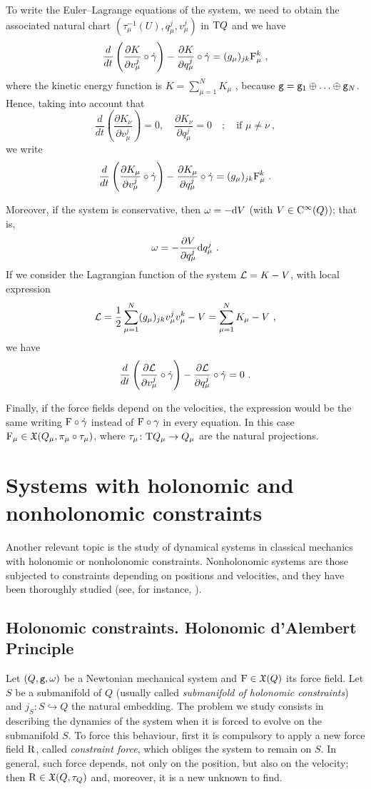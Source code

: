 \documentclass[12pt]{report}
\def\dst{\displaystyle}
\def\derpar#1#2{\frac{\partial{#1}}{\partial{#2}}}
\def\vf{\mathfrak X}
\def\Lag{{\cal L}}
\def\d{{\rm d}}
\def\Tan{{\rm T}}
\def\Cinfty{{\rm C}^\infty}
\begin{document}
To write the Euler--Lagrange equations of the system,
we need to obtain the associated natural chart $(\tau^{-1}_\mu (U),q_\mu^j,v_\mu^j)$
in $\Tan Q$ and we have
$$
\frac{d}{d t}\left(\derpar{K}{v^j_\mu}\circ\dot\gamma\right)-
\derpar{K}{q^j_\mu}\circ\dot\gamma=
( g_\mu)_{jk}{\rm F}_\mu^k \ ,
$$
where the kinetic energy function is \(\dst K=\sum_{\mu=1}^NK_\mu\) ,
because ${\tt g}={\tt g}_1\oplus\ldots\oplus {\tt g}_N$. Hence, taking into account that
$$
\frac{d}{d t}\left(\derpar{K_\nu}{v^j_\mu}\right)= 0 ,\quad
\derpar{K_\nu}{q^j_\mu}=0 \quad ;\quad \mbox{if $\mu\not=\nu$} \ ,
$$
we write
$$
\frac{d}{d t}\left(\derpar{K_\mu}{v^j_\mu}\circ\dot\gamma\right)-
\derpar{K_\mu}{q^j_\mu}\circ\dot\gamma=
(g_\mu)_{jk}{\rm F}_\mu^k \ .
$$

Moreover, if the system is conservative, then $\omega=-\d V$ (with $V\in\Cinfty (Q)$);
that is,
$$
\omega=-\derpar{V}{q^j_\mu}\d q^j_\mu \ .
$$
If we consider the Lagrangian function of the system $\Lag=K-V$,
with local expression
$$
\Lag =\frac{1}{2}\sum_{\mu=1}^N(g_\mu)_{jk}v^j_\mu v^k_\mu-V=
\sum_{\mu=1}^NK_\mu-V \ ,
$$
we have
$$
\frac{d}{d t}\left(\derpar{\Lag}{v^j_\mu}\circ\dot\gamma\right)-
\derpar{\Lag}{q^j_\mu}\circ\dot\gamma=0 \ .
$$

Finally, if the force fields depend on the velocities, the expression would be the same writing ${\rm F}\circ\dot\gamma$ instead of ${\rm F}\circ\gamma$ in every equation. In this case
${\rm F}_\mu\in\vf (Q_\mu,\pi_\mu\circ\tau_\mu)$, where
$\tau_\mu\colon \Tan Q_{\mu}\to Q_\mu$ are the natural projections.


\section{Systems with holonomic and nonholonomic constraints}
\protect\label{sdnlh}


Another relevant topic is the study of dynamical systems in classical mechanics
with holonomic or nonholonomic constraints.
Nonholonomic systems are those subjected to constraints depending on positions and velocities, and
they  have been thoroughly studied 
(see, for instance,
\cite{Ar-89,Bli,CLMM-2002,LMM,LM-96,Els,Ga-70,Lewis2020,MCL-2000,Neimark-Fufaev,Ve}).


\subsection{Holonomic constraints. Holonomic d'Alembert Principle}


Let $(Q,{\tt g},\omega)$ be a Newtonian mechanical system and ${\rm F}\in\vf (Q)$
its force field. Let $S$ be a submanifold of $Q$
(usually called {\sl submanifold of holonomic constraints}) and
$j_S\colon S\hookrightarrow Q$ the natural embedding. 
The problem we study consists in describing the dynamics of the system when it is forced to evolve on the submanifold $S$.
To force this behaviour, first it is compulsory to apply a new force field ${\rm R}$, called {\sl constraint force}, which obliges the system to remain on $S$.
In general, such force depends, not only on the position, but also on the velocity; 
then ${\rm R}\in\vf (Q,\tau_Q)$ and, moreover, it is a new unknown to find.
\end{document}
